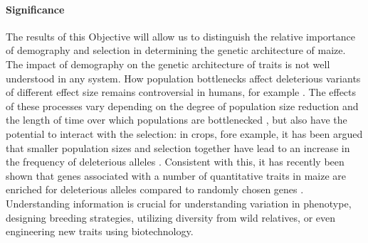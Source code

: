 \vspace{-0.4cm}	%


\vspace{-1ex}
\paragraph{Significance}
The results of this Objective will allow us to distinguish the relative importance of demography and selection in determining the genetic architecture of maize. 
The impact of demography on the genetic architecture of traits is not well understood in any system.  How population bottlenecks affect deleterious variants of different effect size remains controversial in humans, for example \citep{Hancock:2011jb, Henn:2015ce, Henn:2015dp, Lohmueller:2014dn, Simons:2014fj}. The effects of these processes vary depending on the degree of population size reduction and the length of time over which populations are bottlenecked \citep[e.g.][]{Caplins:2008ke}, but also have the potential to interact with the selection: in crops, fore example, it has been argued that smaller population sizes and selection together have lead to an increase in the frequency of deleterious alleles  \citep{Gunther:2010, Renaut:2015hi}. Consistent with this, it has recently been shown that genes associated with a number of quantitative traits in maize are enriched for deleterious alleles compared to randomly chosen genes \citep{Mezmouk:2014jd}. Understanding  information is crucial for understanding variation in phenotype, designing breeding strategies, utilizing diversity from wild relatives, or even engineering new traits using biotechnology. 

